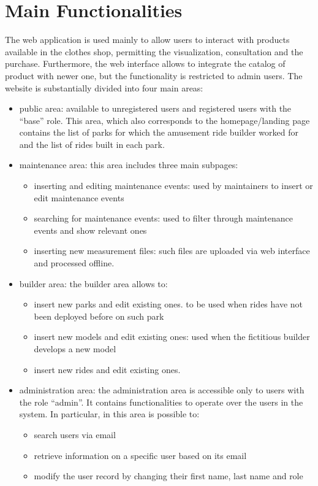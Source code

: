 \section{Main Functionalities}

The web application is used mainly to allow users to interact with products available in the clothes shop, permitting the 
visualization, consultation and the purchase.
Furthermore, the web interface allows to integrate the catalog of product with newer one, but the functionality is restricted to admin users.
The website is substantially divided into four main areas:
\begin{itemize}
    \item  public area: available to unregistered users and registered users with the “base” role. This area, which also corresponds to the homepage/landing page contains the list of parks for which the amusement ride builder worked for and the list of rides built in each park.
    \item maintenance area: this area includes three main subpages:
    \begin{itemize}
        \item inserting and editing maintenance events: used by maintainers to insert or edit maintenance events
        \item searching for maintenance events: used to filter through maintenance events and show relevant ones
        \item inserting new measurement files: such files are uploaded via web interface and processed offline.
    \end{itemize}
    \item builder area: the builder area allows to:
    \begin{itemize}
        \item insert new parks and edit existing ones. to be used when rides have not been deployed before on such park
        \item insert new models and edit existing ones: used when the fictitious builder develops a new model
        \item insert new rides and edit existing ones.
    \end{itemize}
    \item administration area: the administration area is accessible only to users with the role “admin”. It contains functionalities to operate over the users in the system. In particular, in this area is possible to:
    \begin{itemize}
        \item search users via email
        \item retrieve information on a specific user based on its email
        \item modify the user record by changing their first name, last name and role
    \end{itemize}
\end{itemize}


